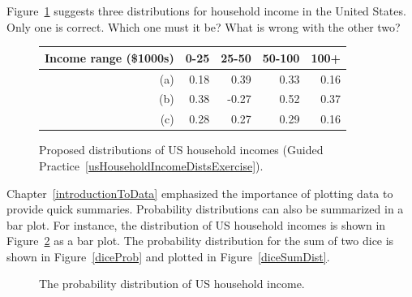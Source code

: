 \begin{exercisewrap}
\begin{nexercise}\label{usHouseholdIncomeDistsExercise}
Figure~\ref{usHouseholdIncomeDists} suggests three distributions for household income in the United States. Only one is correct. Which one must it be? What is wrong with the other two?\footnotemark
\end{nexercise}
\end{exercisewrap}

\begin{figure}
\centering
\begin{tabular}{r | rr rr}
  \hline
Income range (\$1000s) & 0-25    & 25-50    & 50-100     & 100+    \\
  \hline
(a)\hspace{0.2mm}	 & 0.18 & 0.39 & 0.33 & 0.16 \\
(b)				 & 0.38 & -0.27 & 0.52 & 0.37 \\
(c)\hspace{0.2mm}	 & 0.28 & 0.27 & 0.29 & 0.16 \\
  \hline
\end{tabular}
\caption{Proposed distributions of US household incomes (Guided Practice~\ref{usHouseholdIncomeDistsExercise}).}
\label{usHouseholdIncomeDists}
\end{figure}

Chapter~\ref{introductionToData} emphasized the importance of plotting data to provide quick summaries. Probability distributions can also be summarized in a bar plot. For instance, the distribution of US household incomes is shown in Figure~\ref{usHouseholdIncomeDistBar} as a bar plot. %
The probability distribution for the sum of two dice is shown in Figure~\ref{diceProb} and plotted in Figure~\ref{diceSumDist}.

\begin{figure}
  \centering
  \caption{The probability distribution of US household income.}
  \label{usHouseholdIncomeDistBar}
\end{figure}

